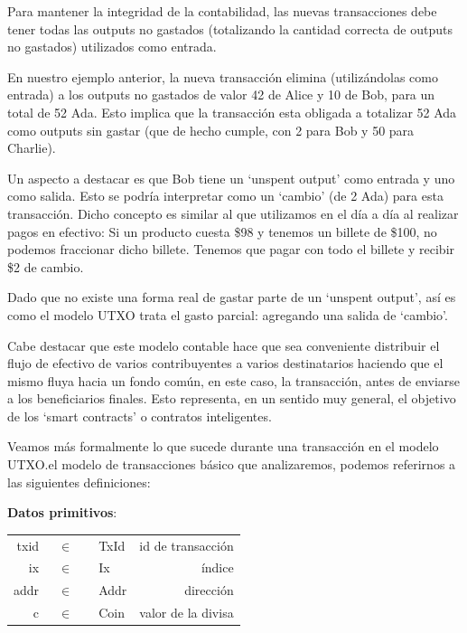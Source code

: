 \documentclass[12pt]{book}
\begin{document}
Para mantener la integridad de la contabilidad, las nuevas transacciones debe tener todas las outputs no gastados (totalizando la cantidad correcta de outputs no gastados) utilizados como entrada.

En nuestro ejemplo anterior, la nueva transacción elimina (utilizándolas como entrada) a los outputs no gastados de valor 42 de Alice y 10 de Bob, para un total de 52 Ada. Esto implica que la transacción esta obligada a totalizar 52 Ada como outputs sin gastar (que de hecho cumple, con 2 para Bob y 50 para Charlie).

Un aspecto a destacar es que Bob tiene un `unspent output' como entrada y uno como salida. Esto se podría interpretar como un `cambio' (de 2 Ada) para esta transacción. Dicho concepto es similar al que utilizamos en el día a día al realizar pagos en efectivo: Si un producto cuesta \$98 y tenemos un billete de \$100, no podemos fraccionar dicho billete. Tenemos que pagar con todo el billete y recibir \$2 de cambio.

Dado que no existe una forma real de gastar parte de un `unspent output', así es como el modelo UTXO trata el gasto parcial: agregando una salida de `cambio'.

Cabe destacar que este modelo contable hace que sea conveniente distribuir el flujo de efectivo de varios contribuyentes a varios destinatarios haciendo que el mismo fluya hacia un fondo común, en este caso, la transacción, antes de enviarse a los beneficiarios finales. Esto representa, en un sentido muy general, el objetivo de los `smart contracts' o contratos inteligentes.

Veamos más formalmente lo que sucede durante una transacción en el modelo UTXO.\@Para el modelo de transacciones básico que analizaremos, podemos referirnos a las siguientes definiciones:

\textbf{Datos primitivos}:

\begin{center}
    \begin{tabular}{ r @{} c @{} l r }
        txid &\ $\in$\ \ & TxId & id de transacción \\
        ix &\ $\in$\ \ & Ix & índice \\
        addr &\ $\in$\ \ & Addr & dirección \\
        c &\ $\in$\ \ & Coin & valor de la divisa \\
    \end{tabular}
\end{center}
\end{document}
